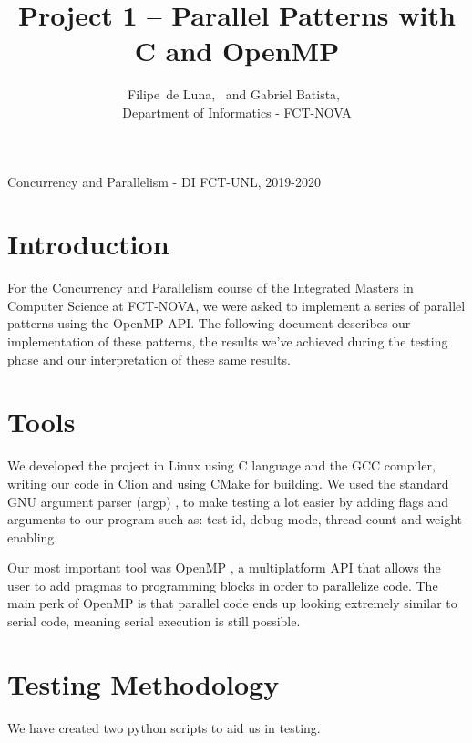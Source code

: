 \documentclass[9pt,journal]{IEEEtran}
\begin{document}

\title{Project 1 -- Parallel Patterns with C and OpenMP}


\author{
	{
		Filipe~de Luna,~ and
        Gabriel Batista,~
    } \\ Department of Informatics - FCT-NOVA
        
}

%
{Concurrency and Parallelism - DI FCT-UNL, 2019-2020}

\maketitle

\section{Introduction}
For the Concurrency and Parallelism course of the Integrated Masters in Computer Science at FCT-NOVA, we were asked to implement a series of parallel patterns using the OpenMP API. The following document describes our implementation of these patterns, the results we’ve achieved during the testing phase and our interpretation of these same results.

\section{Tools}

We developed the project in Linux using C language and the GCC compiler, writing our code in Clion and using CMake for building. We used the standard GNU argument parser (argp) \cite{argp}, to make testing a lot easier by adding flags and arguments to our program such as: test id, debug mode, thread count and weight enabling.

Our most important tool was OpenMP \cite{omp}, a multiplatform API that allows the user to add pragmas to programming blocks in order to parallelize code. The main perk of OpenMP is that parallel code ends up looking extremely similar to serial code, meaning serial execution is still possible.

\section{Testing Methodology}

We have created two python scripts to aid us in testing.
\end{document}
